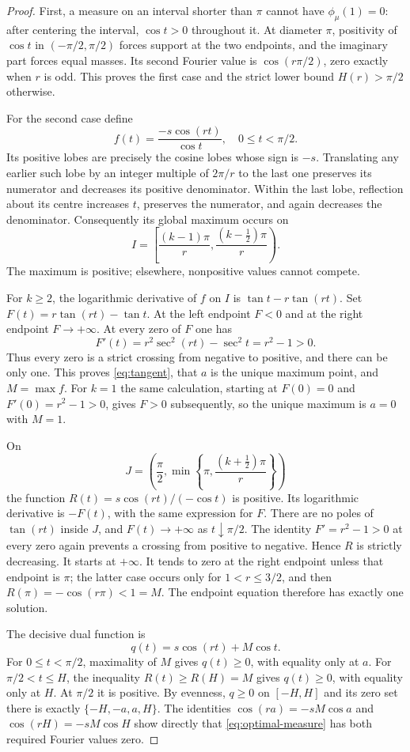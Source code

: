 \begin{proof}
First, a measure on an interval shorter than $\pi$ cannot have
$\phi_\mu(1)=0$: after centering the interval, $\cos t>0$ throughout it.
At diameter $\pi$, positivity of $\cos t$ in $(-\pi/2,\pi/2)$ forces
support at the two endpoints, and the imaginary part forces equal masses.
Its second Fourier value is $\cos(r\pi/2)$, zero exactly when $r$ is odd.
This proves the first case and the strict lower bound $H(r)>\pi/2$ otherwise.

For the second case define
\[
 f(t)=\frac{-s\cos(rt)}{\cos t},\quad 0\le t<\pi/2.
\]
Its positive lobes are precisely the cosine lobes whose sign is $-s$.
Translating any earlier such lobe by an integer multiple of $2\pi/r$
to the last one preserves its numerator and decreases its positive
denominator. Within the last lobe, reflection about its centre increases
$t$, preserves the numerator, and again decreases the denominator.
Consequently its global maximum occurs on
\[
 I=\left[\frac{(k-1)\pi}{r},\frac{(k-\tfrac12)\pi}{r}\right).
\]
The maximum is positive; elsewhere, nonpositive values cannot compete.

For $k\ge2$, the logarithmic derivative of $f$ on $I$ is
$\tan t-r\tan(rt)$. Set $F(t)=r\tan(rt)-\tan t$.
At the left endpoint $F<0$ and at the right endpoint $F\to+\infty$.
At every zero of $F$ one has
\[
 F'(t)=r^2\sec^2(rt)-\sec^2t=r^2-1>0.
\]
Thus every zero is a strict crossing from negative to positive, and there
can be only one. This proves \eqref{eq:tangent}, that $a$ is the unique
maximum point, and $M=\max f$. For $k=1$ the same calculation, starting
at $F(0)=0$ and $F'(0)=r^2-1>0$, gives $F>0$ subsequently, so the unique
maximum is $a=0$ with $M=1$.

On
\[
 J=\left(\frac\pi2,\min\left\{\pi,
                    \frac{(k+\tfrac12)\pi}{r}\right\}\right)
\]
the function $R(t)=s\cos(rt)/(-\cos t)$ is positive. Its logarithmic
derivative is $-F(t)$, with the same expression for $F$. There are no
poles of $\tan(rt)$ inside $J$, and $F(t)\to+\infty$ as
$t\downarrow\pi/2$. The identity $F'=r^2-1>0$ at every zero again
prevents a crossing from positive to negative. Hence $R$ is strictly
decreasing. It starts at $+\infty$. It tends to zero at the right
endpoint unless that endpoint is $\pi$; the latter case occurs only
for $1<r\le3/2$, and then $R(\pi)=-\cos(r\pi)<1=M$.
The endpoint equation therefore has exactly one solution.

The decisive dual function is
\begin{equation}\label{eq:dual}
 q(t)=s\cos(rt)+M\cos t.
\end{equation}
For $0\le t<\pi/2$, maximality of $M$ gives $q(t)\ge0$, with equality
only at $a$. For $\pi/2<t\le H$, the inequality $R(t)\ge R(H)=M$
gives $q(t)\ge0$, with equality only at $H$. At $\pi/2$ it is positive.
By evenness, $q\ge0$ on $[-H,H]$ and its zero set there is exactly
$\{-H,-a,a,H\}$. The identities
$\cos(ra)=-sM\cos a$ and $\cos(rH)=-sM\cos H$ show directly that
\eqref{eq:optimal-measure} has both required Fourier values zero.


\end{proof}
